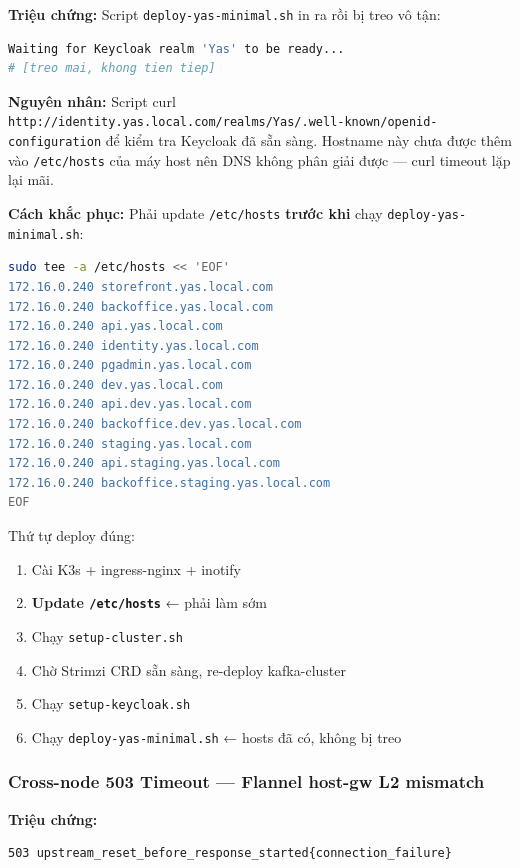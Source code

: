 \textbf{Triệu chứng:} Script \texttt{deploy-yas-minimal.sh} in ra rồi bị treo vô tận:

\begin{lstlisting}[language=bash]
Waiting for Keycloak realm 'Yas' to be ready...
# [treo mai, khong tien tiep]
\end{lstlisting}

\textbf{Nguyên nhân:} Script curl \texttt{http://identity.yas.local.com/realms/Yas/.well-known/openid-configuration} để kiểm tra Keycloak đã sẵn sàng. Hostname này chưa được thêm vào \texttt{/etc/hosts} của máy host nên DNS không phân giải được — curl timeout lặp lại mãi.

\textbf{Cách khắc phục:} Phải update \texttt{/etc/hosts} \textbf{trước khi} chạy \texttt{deploy-yas-minimal.sh}:

\begin{lstlisting}[language=bash]
sudo tee -a /etc/hosts << 'EOF'
172.16.0.240 storefront.yas.local.com
172.16.0.240 backoffice.yas.local.com
172.16.0.240 api.yas.local.com
172.16.0.240 identity.yas.local.com
172.16.0.240 pgadmin.yas.local.com
172.16.0.240 dev.yas.local.com
172.16.0.240 api.dev.yas.local.com
172.16.0.240 backoffice.dev.yas.local.com
172.16.0.240 staging.yas.local.com
172.16.0.240 api.staging.yas.local.com
172.16.0.240 backoffice.staging.yas.local.com
EOF
\end{lstlisting}

Thứ tự deploy đúng:
\begin{enumerate}
  \item Cài K3s + ingress-nginx + inotify
  \item \textbf{Update \texttt{/etc/hosts}} ← phải làm sớm
  \item Chạy \texttt{setup-cluster.sh}
  \item Chờ Strimzi CRD sẵn sàng, re-deploy kafka-cluster
  \item Chạy \texttt{setup-keycloak.sh}
  \item Chạy \texttt{deploy-yas-minimal.sh} ← hosts đã có, không bị treo
\end{enumerate}

\subsubsection{Cross-node 503 Timeout — Flannel host-gw L2 mismatch}

\textbf{Triệu chứng:}

\begin{lstlisting}[language=bash]
503 upstream_reset_before_response_started{connection_failure}
\end{lstlisting}

